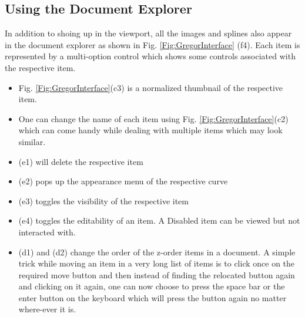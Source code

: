 \subsection{Using the Document Explorer}
{
    In addition to shoing up in the viewport, all the images and splines also appear in the document explorer as shown in Fig. \ref{Fig:GregorInterface} (f4). Each item is represented by a multi-option control which shows some controls associated with the respective item.
    \begin{itemize}
      \item Fig. \ref{Fig:GregorInterface}(c3) is a normalized thumbnail of the respective item.
      \item One can change the name of each item using Fig. \ref{Fig:GregorInterface}(c2) which can come handy while dealing with multiple items which may look similar.
      \item (e1) will delete the respective item
      \item (e2) pops up the appearance menu of the respective curve
      \item (e3) toggles the visibility of the respective item
      \item (e4) toggles the editability of an item. A Disabled item can be viewed but not interacted with.
      \item (d1) and (d2) change the order of the z-order items in a document. A simple trick while moving an item in a very long list of items is to click once on the required move button and then instead of finding the relocated button again and clicking on it again, one can now choose to press the space bar or the enter button on the keyboard which will press the button again no matter where-ever it is.
    \end{itemize}
    
}
